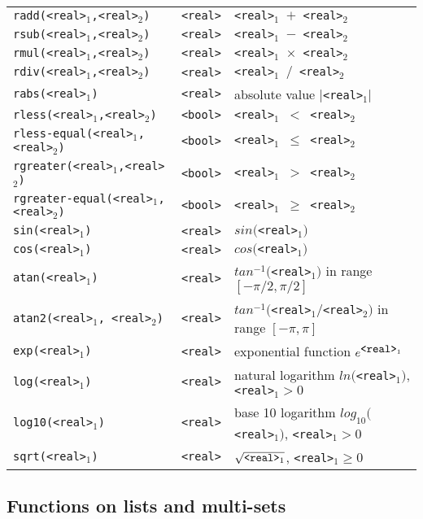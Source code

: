 \documentclass[a4,twoside,noweb]{article} %
\begin{document}
\begin{tabular}{|l|l|p{8cm}|}
 {\tt radd(<real>$_1$,<real>$_2$)}	& {\tt  <real>}  & {\tt <real>$_1$ $+$ <real>$_2$} \\ 
 {\tt rsub(<real>$_1$,<real>$_2$)}	& {\tt  <real>} & {\tt <real>$_1$ $-$ <real>$_2$} \\ 
 {\tt rmul(<real>$_1$,<real>$_2$)}	& {\tt  <real>} & {\tt <real>$_1$ $\times$ <real>$_2$} \\ 
 {\tt rdiv(<real>$_1$,<real>$_2$)}	& {\tt  <real>} & {\tt <real>$_1$ $/$ <real>$_2$} \\
 {\tt rabs(<real>$_1$)}			& {\tt  <real>}  & absolute value $|${\tt <real>}$_1 |$ \\
 {\tt rless(<real>$_1$,<real>$_2$)}	& {\tt  <bool>} & {\tt <real>$_1$ $<$ <real>$_2$} \\ 
 {\tt rless-equal(<real>$_1$,<real>$_2$)}& {\tt  <bool>} & {\tt <real>$_1$ $\leq$ <real>$_2$} \\ 
 {\tt rgreater(<real>$_1$,<real>$_2$)}	& {\tt  <bool>} & {\tt <real>$_1$ $>$ <real>$_2$} \\ 
 {\tt rgreater-equal(<real>$_1$,<real>$_2$)}& {\tt  <bool>} & {\tt <real>$_1$ $\geq$ <real>$_2$} \\ \hline
 {\tt sin(<real>$_1$)}			& {\tt  <real>}  & $sin(${\tt <real>}$_1)$ \\ 
 {\tt cos(<real>$_1$)}			& {\tt  <real>}  & $cos(${\tt <real>}$_1)$ \\ 
 {\tt atan(<real>$_1$)}			& {\tt  <real>}  & $tan^{-1}(${\tt <real>}$_1)$ in range $[-\pi/2, \pi/2]$ \\ 
 {\tt atan2(<real>$_1$, <real>$_2$)}	& {\tt  <real>}  & $tan^{-1}(${\tt <real>}$_1 / ${\tt <real>}$_2 )$ in range $[-\pi, \pi]$ \\ 
 {\tt exp(<real>$_1$)}			& {\tt  <real>}  & exponential function $e^{\mbox{{\tt <real>}}_1}$ \\ 
 {\tt log(<real>$_1$)}			& {\tt  <real>}  & natural logarithm $ln(${\tt <real>}$_1)$, 
						           {\tt <real>}$_1 > 0$  \\ 
 {\tt log10(<real>$_1$)}		& {\tt  <real>}  &  base 10 logarithm $log_{10}(${\tt <real>}$_1)$,
						           {\tt <real>}$_1 > 0$  \\ 
 {\tt sqrt(<real>$_1$)}			& {\tt  <real>}  & $\sqrt{\mbox{{\tt <real>}$_1$}}$,
						           {\tt <real>}$_1 \geq 0$  \\ \hline
\end{tabular}

\newpage

\subsection{Functions on lists and multi-sets}
\end{document}
